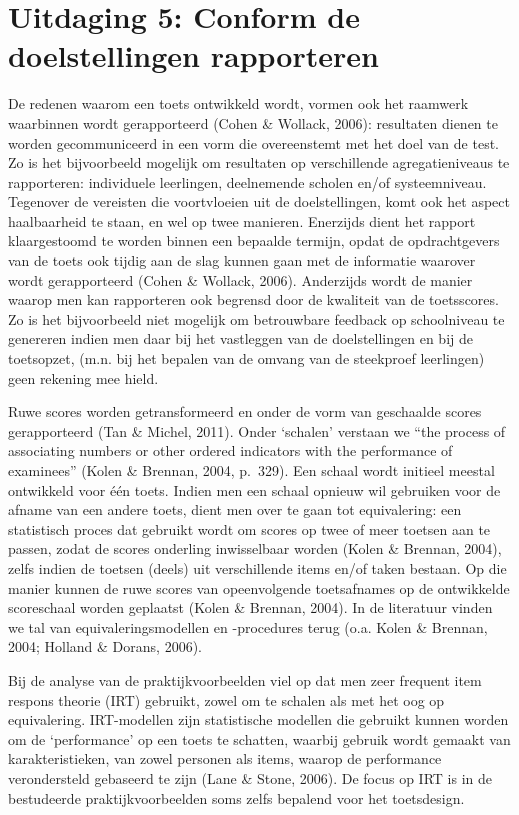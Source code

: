\documentclass[
  letterpaper,
]{report}
\begin{document}
\hypertarget{uitdaging-5-conform-de-doelstellingen-rapporteren}{%
\section{Uitdaging 5: Conform de doelstellingen
rapporteren}\label{uitdaging-5-conform-de-doelstellingen-rapporteren}}

De redenen waarom een toets ontwikkeld wordt, vormen ook het raamwerk
waarbinnen wordt gerapporteerd (Cohen \& Wollack, 2006): resultaten
dienen te worden gecommuniceerd in een vorm die overeenstemt met het
doel van de test. Zo is het bijvoorbeeld mogelijk om resultaten op
verschillende agregatieniveaus te rapporteren: individuele leerlingen,
deelnemende scholen en/of systeemniveau. Tegenover de vereisten die
voortvloeien uit de doelstellingen, komt ook het aspect haalbaarheid te
staan, en wel op twee manieren. Enerzijds dient het rapport
klaargestoomd te worden binnen een bepaalde termijn, opdat de
opdrachtgevers van de toets ook tijdig aan de slag kunnen gaan met de
informatie waarover wordt gerapporteerd (Cohen \& Wollack, 2006).
Anderzijds wordt de manier waarop men kan rapporteren ook begrensd door
de kwaliteit van de toetsscores. Zo is het bijvoorbeeld niet mogelijk om
betrouwbare feedback op schoolniveau te genereren indien men daar bij
het vastleggen van de doelstellingen en bij de toetsopzet, (m.n. bij het
bepalen van de omvang van de steekproef leerlingen) geen rekening mee
hield.

Ruwe scores worden getransformeerd en onder de vorm van geschaalde
scores gerapporteerd (Tan \& Michel, 2011). Onder `schalen' verstaan we
``the process of associating numbers or other ordered indicators with
the performance of examinees'' (Kolen \& Brennan, 2004, p.~329). Een
schaal wordt initieel meestal ontwikkeld voor één toets. Indien men een
schaal opnieuw wil gebruiken voor de afname van een andere toets, dient
men over te gaan tot equivalering: een statistisch proces dat gebruikt
wordt om scores op twee of meer toetsen aan te passen, zodat de scores
onderling inwisselbaar worden (Kolen \& Brennan, 2004), zelfs indien de
toetsen (deels) uit verschillende items en/of taken bestaan. Op die
manier kunnen de ruwe scores van opeenvolgende toetsafnames op de
ontwikkelde scoreschaal worden geplaatst (Kolen \& Brennan, 2004). In de
literatuur vinden we tal van equivaleringsmodellen en -procedures terug
(o.a. Kolen \& Brennan, 2004; Holland \& Dorans, 2006).

Bij de analyse van de praktijkvoorbeelden viel op dat men zeer frequent
item respons theorie (IRT) gebruikt, zowel om te schalen als met het oog
op equivalering. IRT-modellen zijn statistische modellen die gebruikt
kunnen worden om de `performance' op een toets te schatten, waarbij
gebruik wordt gemaakt van karakteristieken, van zowel personen als
items, waarop de performance verondersteld gebaseerd te zijn (Lane \&
Stone, 2006). De focus op IRT is in de bestudeerde praktijkvoorbeelden
soms zelfs bepalend voor het toetsdesign.
\end{document}
